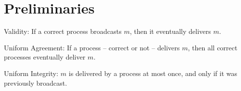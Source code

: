 
\section{Preliminaries}
\label{sec:preliminaries}

\begin{definition}
\end{definition}

\begin{definition}[Broadcast]
  
\end{definition}

\begin{definition}

\begin{asparadesc}
\item [Validity:] If a correct process broadcasts $m$, then it eventually delivers $m$.
\item [Uniform Agreement:] If a process -- correct or not -- delivers $m$, then
  all correct processes eventually deliver $m$.
\item [Uniform Integrity:] $m$ is delivered by a process at most once, and only
  if it was previously broadcast.
\end{asparadesc}

\end{definition}


\begin{definition}
  
\end{definition}


